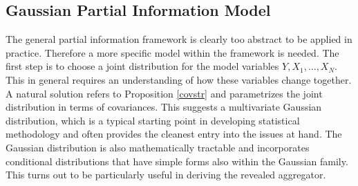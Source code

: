 \documentclass[11pt]{article}
\newcommand{\E}{\mathbb{E}}
\theoremstyle{definition}
\theoremstyle{definition}
\def\E{{\mathbb E}}
\begin{document}
\subsection{Gaussian Partial Information Model}
\label{gaussian}
The general partial information framework is clearly too abstract to be applied in practice. Therefore a more specific model within the framework is needed. The first step is to choose a joint distribution for the model variables $Y, X_1, \dots, X_N$. This in general requires an understanding of how these variables change together. A natural solution refers to Proposition \ref{covstr} and parametrizes the joint distribution in terms of covariances. This suggests a multivariate Gaussian distribution, which is a typical starting point in developing statistical methodology and often provides the cleanest entry into the issues at hand. The Gaussian distribution is also mathematically tractable and incorporates conditional distributions that have simple forms also within the Gaussian family. This turns out to be particularly useful in deriving the revealed aggregator. 






\end{document}
